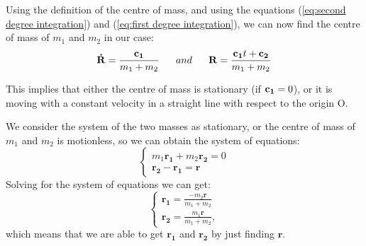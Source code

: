 Using the definition of the centre of mass, and using the equations (\ref{eq:second degree integration}) and (\ref{eq:first degree integration}), we can now find the centre of mass of $m_{1}$ and $m_{2}$ in our case:
\begin{equation}
    {\bf{\dot{R}}} = \frac{{\bf{c_1}}}{m_{1}+m_{2}}~~~~~and~~~~~{\bf{R}} = \frac{{\bf{c_1}}t+{\bf{c_2}}}{m_{1}+m_{2}}
\end{equation}

This implies that either the centre of mass is stationary (if ${\bf{c_1}}=0$), or it is moving with a constant velocity in a straight line with respect to the origin O.

We consider the system of the two masses as stationary, or the centre of mass of $m_1$ and $m_2$ is motionless, so we can obtain the system of equations:
\begin{equation}
    \begin{cases}
        m_1 \mathbf{r_1} + m_2 \mathbf{r_2} = 0\\
        \mathbf{r_2 - r_1 = r}
    \end{cases}
\end{equation}
Solving for the system of equations we can get:
\begin{equation}
    \begin{cases}
        \mathbf{r_1} = \frac{-m_2 \mathbf{r}}{m_1 + m_2}\\
        \mathbf{r_2} = \frac{m_1 \mathbf{r}}{m_1 + m_2},
    \end{cases}
\end{equation}
which means that we are able to get $\mathbf{r_1}$ and $\mathbf{r_2}$ by just finding $\mathbf{r}$.\\\\

